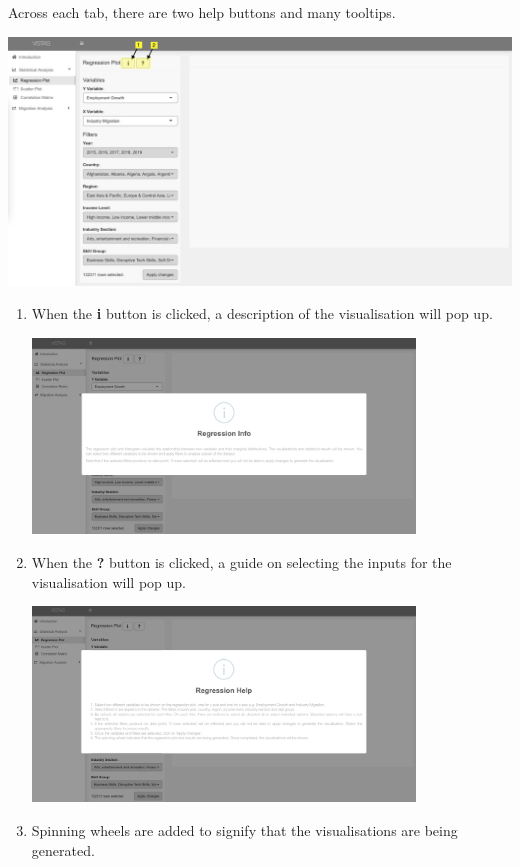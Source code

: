 \documentclass[
]{article}
\begin{document}
Across each tab, there are two help buttons and many tooltips.

\includegraphics{images/04-info-user-guide.png}

\begin{enumerate}
\def\labelenumi{\arabic{enumi}.}
\item
  When the \textbf{i} button is clicked, a description of the
  visualisation will pop up.

  \includegraphics[width=0.8\textwidth,height=\textheight]{images/04-regression-info.png}
\item
  When the \textbf{?} button is clicked, a guide on selecting the inputs
  for the visualisation will pop up.

  \includegraphics[width=0.8\textwidth,height=\textheight]{images/05-regression-help.png}
\item
  Spinning wheels are added to signify that the visualisations are being
  generated.


\end{enumerate}
\end{document}
